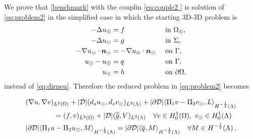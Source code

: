 \documentclass[r]{siamart171218}
\begin{document}
We prove that \eqref{benchmark} with the couplin \eqref{eq:couple2 } is solution
of \eqref{eq:problem2} in the simplified case in which the starting 3D-3D problem is
\begin{subequations}\label{eq:dirneu_simple}
\begin{align}
- \Delta u_{\oplus}  &= f  && \text{ in } \Omega_{\oplus},\\
- \Delta u_{\ominus} &= g  && \text{ in } \Sigma,\\
-\nabla u_{\ominus} \cdot \boldsymbol n_{\ominus} &= -\nabla u_{\oplus} \cdot \boldsymbol n_{\ominus}  && \text{ on } \Gamma,\\
u_{\ominus} - u_{\oplus} &= q  && \text{ on }  \Gamma,\\
u_{\oplus} &= h && \text{ on } \partial \Omega.
\end{align}
\end{subequations}
instead of \eqref{eq:dirneu}. Therefore the reduced problem in \eqref{eq:problem2} becomes
 
\begin{subequations}\label{eq:problem2_simple}
\begin{align}
&(\nabla u,\nabla v)_{L^2(\Omega)} + |{\cal D}|(d_s \ud,d_s \vd)_{L^2(\Lambda)} 
+ |\partial {\cal D}| \langle \Pi_1 v - \Pi_2 \vd, L \rangle_{H^{-\frac12}(\Lambda)} 
\\
\nonumber
&\qquad\qquad= (f,v)_{L^2(\Omega)} + |{\cal D}| (\avrd{g},V)_{L^2(\Lambda)}
\quad \forall v \in H^1_0(\Omega), \ \vd \in H^1_0(\Lambda)
\\
&  |\partial {\cal D}| \langle \Pi_1 u -  \Pi_2 \ud, M \rangle_{H^{-\frac12}(\Lambda)} =|\partial {\cal D}| \langle \avrc{q}, M \rangle_{H^{-\frac12}(\Lambda)}
\quad \forall M \in H^{-\frac12}(\Lambda)\,.
\end{align}
\end{subequations}
\end{document}
